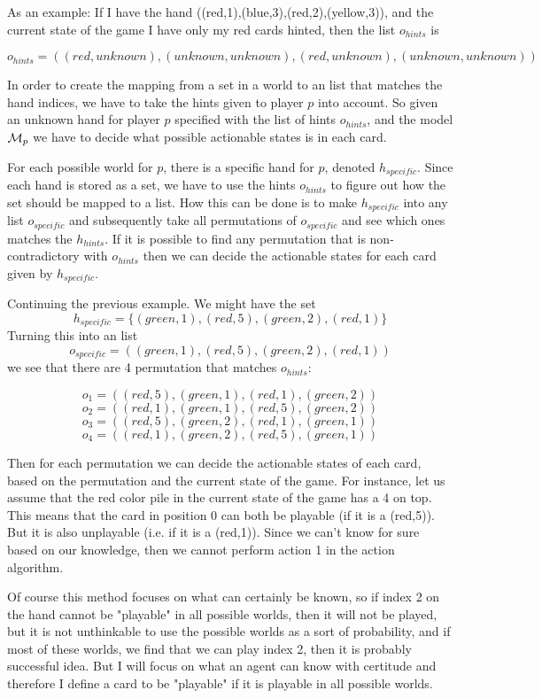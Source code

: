As an example: If I have the hand ((red,1),(blue,3),(red,2),(yellow,3)), and the current state of the game I have only my red cards hinted, then the list $o_{hints}$ is

\[o_{hints} = ((red,unknown),(unknown,unknown),(red,unknown),(unknown,unknown))\]


In order to create the mapping from a set in a world to an list that matches the hand indices, we have to take the hints given to player $p$ into account.
So given an unknown hand for player $p$ specified with the list of hints $o_{hints}$, and the model $\mathcal{M}_p$ we have to decide what possible actionable states is in each card. 

For each possible world for $p$, there is a specific hand for $p$, denoted $h_{specific}$. Since each hand is stored as a set, we have to use the hints $o_{hints}$ to figure out how the set should be mapped to a list. How this can be done is to make $h_{specific}$ into any list $o_{specific}$ and subsequently take all permutations of $o_{specific}$ and see which ones matches the $h_{hints}$. If it is possible to find any permutation that is non-contradictory with $o_{hints}$ then we can decide the actionable states for each card given by $h_{specific}$.

Continuing the previous example. We might have the set \[h_{specific} = \{(green,1),(red,5),(green,2),(red,1)\}\]
Turning this into an list 
\[o_{specific} = ((green,1),(red,5),(green,2),(red,1))\]
we see that there are 4 permutation that matches $o_{hints}$:

\[o_{1} = ((red,5),(green,1),(red,1),(green,2))\]
\[o_{2} = ((red,1),(green,1),(red,5),(green,2))\]
\[o_{3} = ((red,5),(green,2),(red,1),(green,1))\]
\[o_{4} = ((red,1),(green,2),(red,5),(green,1))\]

Then for each permutation we can decide the actionable states of each card, based on the permutation and the current state of the game. For instance, let us assume that the red color pile in the current state of the game has a 4 on top. This means that the card in position 0 can both be playable (if it is a (red,5)). But it is also unplayable (i.e. if it is a (red,1)). Since we can't know for sure based on our knowledge, then we cannot perform action 1 in the action algorithm.

Of course this method focuses on what can certainly be known, so if index 2 on the hand cannot be "playable" in all possible worlds, then it will not be played, but it is not unthinkable to use the possible worlds as a sort of probability, and if most of these worlds, we find that we can play index 2, then it is probably successful idea. But I will focus on what an agent can know with certitude and therefore I define a card to be "playable" if it is playable in all possible worlds.

